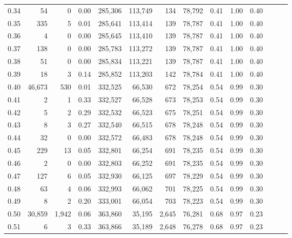 \begin{tabular}{rrrrrrrrrrrrrr}
0.34 &      54 &       0 &  0.00 &  285,306 &  113,749 &     134 &  78,792 &  0.41 &  1.00 &      0.40 \\
0.35 &     335 &       5 &  0.01 &  285,641 &  113,414 &     139 &  78,787 &  0.41 &  1.00 &      0.40 \\
0.36 &       4 &       0 &  0.00 &  285,645 &  113,410 &     139 &  78,787 &  0.41 &  1.00 &      0.40 \\
0.37 &     138 &       0 &  0.00 &  285,783 &  113,272 &     139 &  78,787 &  0.41 &  1.00 &      0.40 \\
0.38 &      51 &       0 &  0.00 &  285,834 &  113,221 &     139 &  78,787 &  0.41 &  1.00 &      0.40 \\
0.39 &      18 &       3 &  0.14 &  285,852 &  113,203 &     142 &  78,784 &  0.41 &  1.00 &      0.40 \\
0.40 &  46,673 &     530 &  0.01 &  332,525 &   66,530 &     672 &  78,254 &  0.54 &  0.99 &      0.30 \\
0.41 &       2 &       1 &  0.33 &  332,527 &   66,528 &     673 &  78,253 &  0.54 &  0.99 &      0.30 \\
0.42 &       5 &       2 &  0.29 &  332,532 &   66,523 &     675 &  78,251 &  0.54 &  0.99 &      0.30 \\
0.43 &       8 &       3 &  0.27 &  332,540 &   66,515 &     678 &  78,248 &  0.54 &  0.99 &      0.30 \\
0.44 &      32 &       0 &  0.00 &  332,572 &   66,483 &     678 &  78,248 &  0.54 &  0.99 &      0.30 \\
0.45 &     229 &      13 &  0.05 &  332,801 &   66,254 &     691 &  78,235 &  0.54 &  0.99 &      0.30 \\
0.46 &       2 &       0 &  0.00 &  332,803 &   66,252 &     691 &  78,235 &  0.54 &  0.99 &      0.30 \\
0.47 &     127 &       6 &  0.05 &  332,930 &   66,125 &     697 &  78,229 &  0.54 &  0.99 &      0.30 \\
0.48 &      63 &       4 &  0.06 &  332,993 &   66,062 &     701 &  78,225 &  0.54 &  0.99 &      0.30 \\
0.49 &       8 &       2 &  0.20 &  333,001 &   66,054 &     703 &  78,223 &  0.54 &  0.99 &      0.30 \\
0.50 &  30,859 &   1,942 &  0.06 &  363,860 &   35,195 &   2,645 &  76,281 &  0.68 &  0.97 &      0.23 \\
0.51 &       6 &       3 &  0.33 &  363,866 &   35,189 &   2,648 &  76,278 &  0.68 &  0.97 &      0.23 \\

\end{tabular}
